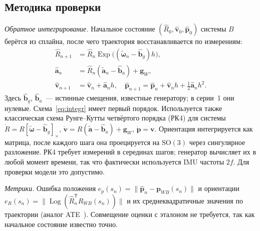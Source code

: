 \documentclass{misisarticle}
\newcommand{\Exp}{\operatorname{Exp}}
\newcommand{\Log}{\operatorname{Log}}
\newcommand{\cross}[1]{[#1]_{\times}}
\newcommand{\SO}{\mathrm{SO}(3)}
\newcommand{\T}{^{\mathsf{T}}}
\newcommand{\vb}[1]{\mathbf{#1}}
\begin{document}
\subsection{Методика проверки}

\textit{Обратное интегрирование.} Начальное состояние $(\hat R_0,\hat{\vb v}_0,\hat{\vb p}_0)$ системы $B$ берётся из сплайна, после чего траектория восстанавливается по измерениям:
\begin{equation}
  \begin{aligned}
    \hat R_{n+1}&=\hat R_n\Exp\bigl((\tilde{\boldsymbol\omega}_n-\hat{\vb b}_g)h\bigr),\\
    \hat{\vb a}_n&=\hat R_n(\tilde{\vb a}_n-\hat{\vb b}_a)+\vb g_W,\\
    \hat{\vb v}_{n+1}&=\hat{\vb v}_n+\hat{\vb a}_n h,\quad
    \hat{\vb p}_{n+1}=\hat{\vb p}_n+\hat{\vb v}_n h+\tfrac12\hat{\vb a}_n h^2.
  \end{aligned}
  \label{eq:integr}
\end{equation}
Здесь $\hat{\vb b}_g$, $\hat{\vb b}_a$~--- истинные смещения, известные генератору; в серии~1 они нулевые. Схема~\eqref{eq:integr} имеет первый порядок. Используется также классическая схема Рунге--Кутты четвёртого порядка (РК4) для системы $\dot R=R\cross{\tilde{\boldsymbol\omega}-\hat{\vb b}_g}$, $\dot{\vb v}=R(\tilde{\vb a}-\hat{\vb b}_a)+\vb g_W$, $\dot{\vb p}=\vb v$. Ориентация интегрируется как матрица, после каждого шага она проецируется на $\SO$ через сингулярное разложение. РК4 требует измерений в серединах шагов; генератор вычисляет их в любой момент времени, так что фактически используется IMU частоты $2f$. Для проверки модели это допустимо.

\textit{Метрики.} Ошибка положения $e_p(s_n)=\|\hat{\vb p}_n-\vb p_{WB}(s_n)\|$ и ориентации $e_R(s_n)=\|\Log(\hat R_n\T R_{WB}(s_n))\|$ и их среднеквадратичные значения по траектории (аналог ATE~\cite{sturm, zhang}). Совмещение оценки с эталоном не требуется, так как начальное состояние известно точно.
\end{document}
